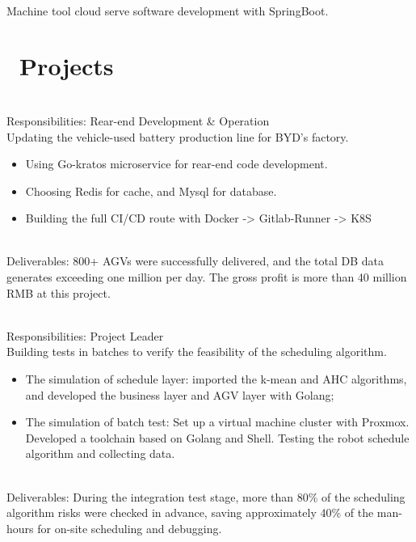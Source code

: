 \documentclass[a4paper,10pt]{resume}
\begin{document}
\\Machine tool cloud serve software development with SpringBoot.

\section{\faFile\ Projects}
\\Responsibilities: Rear-end Development \& Operation
\\Updating the vehicle-used battery production line for BYD's factory.
\begin{itemize}[parsep=0.5ex]
  \item Using Go-kratos microservice for rear-end code development.
  \item Choosing Redis for cache, and Mysql for database.
  \item Building the full CI/CD route with Docker -> Gitlab-Runner -> K8S
\end{itemize}
\\ Deliverables: 800+ AGVs were successfully delivered, and the total DB data generates exceeding one million per day. The gross profit is more than 40 million RMB at this project.


\\Responsibilities: Project Leader
\\Building tests in batches to verify the feasibility of the scheduling algorithm.
\begin{itemize}[parsep=0.5ex]
  \item The simulation of schedule layer: imported the k-mean and AHC algorithms, and developed the business layer and AGV layer with Golang;
  \item The simulation of batch test: Set up a virtual machine cluster with Proxmox. Developed a toolchain based on Golang and Shell. Testing the robot schedule algorithm and collecting data.
\end{itemize}
\\Deliverables: During the integration test stage, more than 80\% of the scheduling algorithm risks were checked in advance, saving approximately 40\% of the man-hours for on-site scheduling and debugging.
\end{document}
